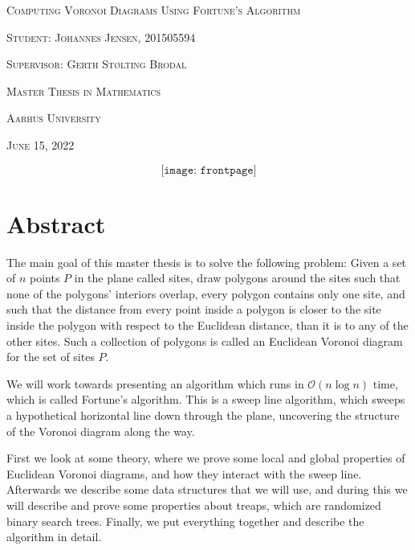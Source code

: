 \documentclass{book}
\begin{document}
\begin{titlepage}
\begin{center}
\Huge{\textsc{Computing Voronoi Diagrams Using Fortune's Algorithm}}

\par
\vspace{0.6cm}

\Large{\textsc{Student: Johannes Jensen, 201505594}}

\par
\vspace{0.33cm}

\Large{\textsc{Supervisor: Gerth Stølting Brodal}}

\par
\vspace{0.33cm}

\large{\textsc{Master Thesis in Mathematics}}
\par
\large{\textsc{Aarhus University}}

\par
\vspace{0.25cm}

\normalsize{\textsc{June 15, 2022}}
\end{center}
\[
    \texttt{[image: frontpage]}
\]

\end{titlepage}

\frontmatter
\chapter{Abstract}

The main goal of this master thesis is to solve the following problem: Given a set of $n$ points $P$ in the plane called sites, draw polygons around the sites such that none of the polygons' interiors overlap, every polygon contains only one site, and such that the distance from every point inside a polygon is closer to the site inside the polygon with respect to the Euclidean distance, than it is to any of the other sites. Such a collection of polygons is called an Euclidean Voronoi diagram for the set of sites $P$.

We will work towards presenting an algorithm which runs in $\mathcal{O}(n \log n)$ time, which is called Fortune's algorithm. This is a sweep line algorithm, which sweeps a hypothetical horizontal line down through the plane, uncovering the structure of the Voronoi diagram along the way.

First we look at some theory, where we prove some local and global properties of Euclidean Voronoi diagrams, and how they interact with the sweep line. Afterwards we describe some data structures that we will use, and during this we will describe and prove some properties about treaps, which are randomized binary search trees. Finally, we put everything together and describe the algorithm in detail.
\end{document}
